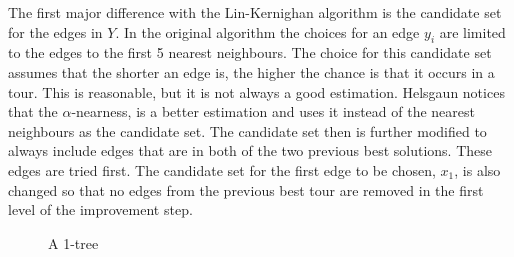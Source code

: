 \documentclass[titlepage, 12pt]{article}
\begin{document}
    The first major difference with the Lin-Kernighan algorithm is the candidate set for the edges
    in $Y$. In the original algorithm the choices for an edge $y_i$ are limited to the edges to the
    first 5 nearest neighbours. The choice for this candidate set assumes that the shorter an edge
    is, the higher the chance is that it occurs in a tour. This is reasonable, but it is not always
    a good estimation. Helsgaun notices that the $\alpha$-nearness, is a better estimation and uses
    it instead of the nearest neighbours as the candidate set.
    The candidate set then is further modified to always include edges that are in both of the two
    previous best solutions. These edges are tried first.
    The candidate set for the first edge to be chosen, $x_1$, is also changed so that no edges from
    the previous best tour are removed in the first level of the improvement step.

    \begin{figure}
    \centering
    \caption{A 1-tree}
    \label{fig:1-tree}
    \end{figure}
\end{document}
